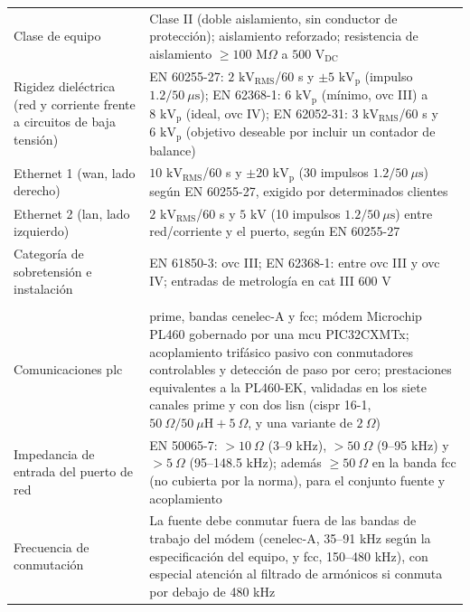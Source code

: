 \begin{longtable}{|>{\raggedright\arraybackslash}p{3.0cm}|>{\raggedright\arraybackslash}p{11.0cm}|}
\multicolumn{2}{|l|}{\textbf{B. Seguridad eléctrica y aislamiento}} \\ \hline
Clase de equipo & Clase II (doble aislamiento, sin conductor de protección); aislamiento reforzado; resistencia de aislamiento $\ge 100\text{ M}\Omega$ a $500\text{ V}_{\text{DC}}$ \\ \hline
Rigidez dieléctrica (red y corriente frente a circuitos de baja tensión) & EN 60255-27: $2\text{ kV}_{\text{RMS}}$/60 s y $\pm5\text{ kV}_{\text{p}}$ (impulso $1.2/50\ \mu\text{s}$); EN 62368-1: $6\text{ kV}_{\text{p}}$ (mínimo, \gls{ovc} III) a $8\text{ kV}_{\text{p}}$ (ideal, \gls{ovc} IV); EN 62052-31: $3\text{ kV}_{\text{RMS}}$/60 s y $6\text{ kV}_{\text{p}}$ (objetivo deseable por incluir un contador de balance) \\ \hline
Ethernet 1 (\gls{wan}, lado derecho) & $10\text{ kV}_{\text{RMS}}$/60 s y $\pm20\text{ kV}_{\text{p}}$ (30 impulsos $1.2/50\ \mu\text{s}$) según EN 60255-27, exigido por determinados clientes \\ \hline
Ethernet 2 (\gls{lan}, lado izquierdo) & $2\text{ kV}_{\text{RMS}}$/60 s y $5\text{ kV}$ (10 impulsos $1.2/50\ \mu\text{s}$) entre red/corriente y el puerto, según EN 60255-27 \\ \hline
Categoría de sobretensión e instalación & EN 61850-3: \gls{ovc} III; EN 62368-1: entre \gls{ovc} III y \gls{ovc} IV; entradas de metrología en \gls{cat} III 600 V \\ \hline

\multicolumn{2}{|l|}{\textbf{C. Comunicaciones PLC y coexistencia electromagnética}} \\ \hline
Comunicaciones \gls{plc} & \gls{prime}, bandas \gls{cenelec}-A y \gls{fcc}; módem Microchip PL460 gobernado por una \gls{mcu} PIC32CXMTx; acoplamiento trifásico pasivo con conmutadores controlables y detección de paso por cero; prestaciones equivalentes a la PL460-EK, validadas en los siete canales \gls{prime} y con dos \gls{lisn} (\gls{cispr} 16-1, $50\ \Omega/50\ \mu\text{H}+5\ \Omega$, y una variante de $2\ \Omega$) \\ \hline
Impedancia de entrada del puerto de red & EN 50065-7: $>10\ \Omega$ (3--9 kHz), $>50\ \Omega$ (9--95 kHz) y $>5\ \Omega$ (95--148.5 kHz); además $\ge 50\ \Omega$ en la banda \gls{fcc} (no cubierta por la norma), para el conjunto fuente y acoplamiento \\ \hline
Frecuencia de conmutación & La fuente debe conmutar fuera de las bandas de trabajo del módem (\gls{cenelec}-A, 35--91 kHz según la especificación del equipo, y \gls{fcc}, 150--480 kHz), con especial atención al filtrado de armónicos si conmuta por debajo de 480 kHz \\ \hline


\end{longtable}
